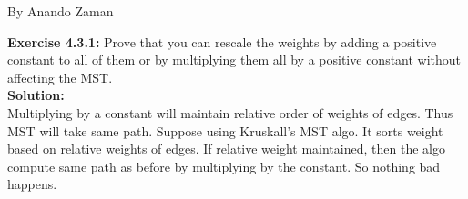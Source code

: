 \documentclass[11pt,fleqn]{article}
\begin{document}
By Anando Zaman


\textbf{Exercise 4.3.1:} Prove that you can rescale the weights by adding a positive constant to all of
them or by multiplying them all by a positive constant without affecting the MST.\\

\textbf{Solution:}\\
Multiplying by a constant will maintain relative order of weights of edges. Thus MST will take same path. Suppose using Kruskall's MST algo. It sorts weight based on relative weights of edges. If relative weight maintained, then the algo compute same path as before by multiplying by the constant. So nothing bad happens.

	
\end{document}
